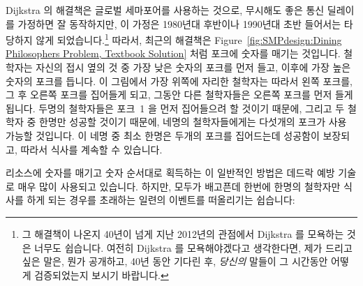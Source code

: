 Dijkstra 의 해결책은 글로벌 세마포어를 사용하는 것으로, 무시해도 좋은 통신
딜레이를 가정하면 잘 동작하지만, 이 가정은 1980년대 후반이나 1990년대 초반
들어서는 타당하지 않게 되었습니다.\footnote{
	그 해결책이 나온지 40년이 넘게 지난 2012년의 관점에서 Dijkstra 를
	모욕하는 것은 너무도 쉽습니다.
	여전히 Dijkstra 를 모욕해야겠다고 생각한다면, 제가 드리고 싶은 말은,
	뭔가 공개하고, 40년 동안 기다린 후, \emph{당신의} 말들이 그 시간동안
	어떻게 검증되었는지 보시기 바랍니다.}
따라서, 최근의 해결책은 
Figure~\ref{fig:SMPdesign:Dining Philosophers Problem, Textbook Solution} 처럼
포크에 숫자를 매기는 것입니다.
철학자는 자신의 접시 옆의 것 중 가장 낮은 숫자의 포크를 먼저 들고, 이후에
가장 높은 숫자의 포크를 듭니다.
이 그림에서 가장 위쪽에 자리한 철학자는 따라서 왼쪽 포크를, 그 후 오른쪽 포크를
집어들게 되고, 그동안 다른 철학자들은 오른쪽 포크를 먼저 들게 됩니다.
두명의 철학자들은 포크~1 을 먼저 집어들으려 할 것이기 때문에, 그리고 두 철학자
중 한명만 성공할 것이기 때문에, 네명의 철학자들에게는 다섯개의 포크가 사용
가능할 것입니다.
이 네명 중 최소 한명은 두개의 포크를 집어드는데 성공함이 보장되고, 따라서
식사를 계속할 수 있습니다.

리소스에 숫자를 매기고 숫자 순서대로 획득하는 이 일반적인 방법은 데드락 예방
기술로 매우 많이 사용되고 있습니다.
하지만, 모두가 배고픈데 한번에 한명의 철학자만 식사를 하게 되는 경우를 초래하는
일련의 이벤트를 떠올리기는 쉽습니다:
\iffalse

